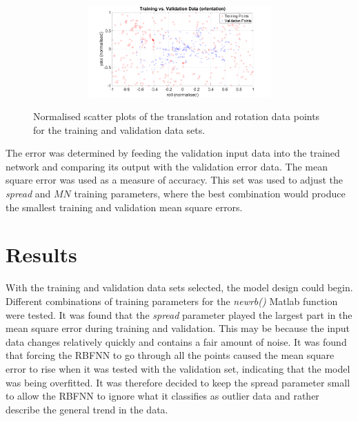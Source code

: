 \begin{figure}
\begin{subfigure}{\textwidth}
\begin{subfigure}{0.48\textwidth}
    \end{subfigure}
    \begin{subfigure}{0.48\textwidth}
      \includegraphics[clip, trim = 80 0 80 0, width=\textwidth]{figures/chapter4/trv_rollyaw}
    \end{subfigure}
    \caption{}
  \end{subfigure}
  \caption[Scatter plots of the training and validation data. ]{Normalised scatter plots of the translation and rotation data points for the training and validation data sets. }
  \label{fig:chap4-scatter-tr-v}
\end{figure}

The error was determined by feeding the validation input data into the trained network and comparing its output with the validation error data. The mean square error was used as a measure of accuracy. This set was used to adjust the \emph{spread} and $\mathit{MN}$ training parameters, where the best combination would produce the smallest training and validation mean square errors. 

\section{Results}

With the training and validation data sets selected, the model design could begin. Different combinations of training parameters for the \emph{newrb()} Matlab function were tested. It was found that the \emph{spread} parameter played the largest part in the mean square error during training and validation. This may be because the input data changes relatively quickly and contains a fair amount of noise. It was found that forcing the RBFNN to go through all the points caused the mean square error to rise when it was tested with the validation set, indicating that the model was being overfitted. It was therefore decided to keep the spread parameter small to allow the RBFNN to ignore what it classifies as outlier data and rather describe the general trend in the data. 

